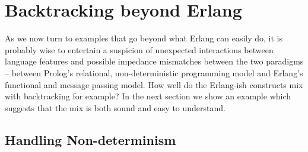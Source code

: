\documentclass{tlp}
\begin{document}
%
%
%


\section{Backtracking beyond Erlang}\label{sec:beyond-erlang}

As we now turn to examples that go beyond what Erlang can easily do, it is probably wise to entertain a suspicion of unexpected interactions between language features and possible impedance mismatches between the two paradigms -- between Prolog's relational, non-deterministic programming model and Erlang's functional and message passing model. How well do the Erlang-ish constructs mix with backtracking for example? In the next section we show an example which suggests that the mix is both sound and easy to understand. 

\subsection{Handling Non-determinism}\label{sec:non-det}
\end{document}
